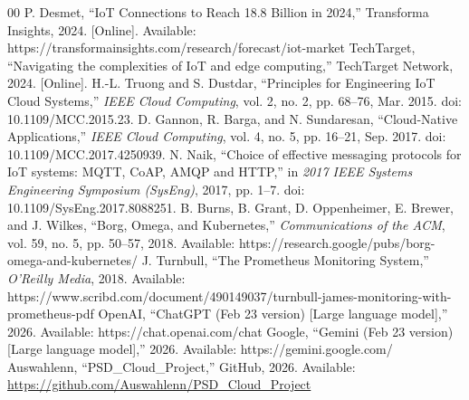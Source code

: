 \documentclass[conference]{IEEEtran}
\begin{document}
\begin{thebibliography}{00}
 P. Desmet, ``IoT Connections to Reach 18.8 Billion in 2024,'' Transforma Insights, 2024. [Online]. Available: https://transformainsights.com/research/forecast/iot-market
 TechTarget, ``Navigating the complexities of IoT and edge computing,'' TechTarget Network, 2024. [Online].
 H.-L. Truong and S. Dustdar, ``Principles for Engineering IoT Cloud Systems,'' \textit{IEEE Cloud Computing}, vol. 2, no. 2, pp. 68--76, Mar. 2015. doi: 10.1109/MCC.2015.23.
 D. Gannon, R. Barga, and N. Sundaresan, ``Cloud-Native Applications,'' \textit{IEEE Cloud Computing}, vol. 4, no. 5, pp. 16--21, Sep. 2017. doi: 10.1109/MCC.2017.4250939.
 N. Naik, ``Choice of effective messaging protocols for IoT systems: MQTT, CoAP, AMQP and HTTP,'' in \textit{2017 IEEE Systems Engineering Symposium (SysEng)}, 2017, pp. 1--7. doi: 10.1109/SysEng.2017.8088251.
 B. Burns, B. Grant, D. Oppenheimer, E. Brewer, and J. Wilkes, ``Borg, Omega, and Kubernetes,'' \textit{Communications of the ACM}, vol. 59, no. 5, pp. 50--57, 2018. Available: https://research.google/pubs/borg-omega-and-kubernetes/
J. Turnbull, ``The Prometheus Monitoring System,'' \textit{O'Reilly Media}, 2018. Available: https://www.scribd.com/document/490149037/turnbull-james-monitoring-with-prometheus-pdf
 OpenAI, ``ChatGPT (Feb 23 version) [Large language model],'' 2026. Available: https://chat.openai.com/chat
 Google, ``Gemini (Feb 23 version) [Large language model],'' 2026. Available: https://gemini.google.com/
 Auswahlenn, ``PSD\_Cloud\_Project,'' GitHub, 2026. Available: \url{https://github.com/Auswahlenn/PSD_Cloud_Project}
\end{thebibliography}
\end{document}
